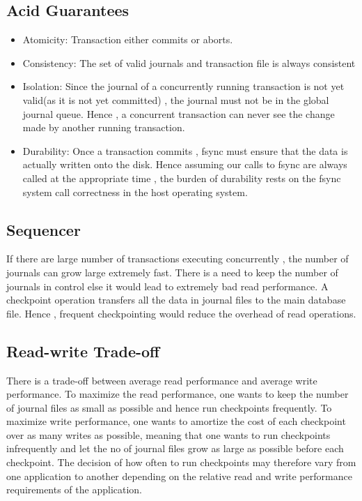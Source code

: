 \documentclass[11pt,a4paper]{article}
\begin{document}
\subsection{Acid Guarantees}
\begin{itemize}
\item Atomicity: 
    Transaction either commits or aborts.
\item Consistency: 
    The set of valid journals and transaction file is always consistent
\item Isolation: 
	Since the journal of a concurrently running transaction is not yet valid(as it is not yet committed) , the journal must not be in the global journal queue. Hence , a concurrent transaction can never see the change made by another running transaction.
\item Durability: 
    Once a transaction commits , fsync must ensure that the data is actually written onto the disk. Hence assuming our calls to fsync are always called at the appropriate time , the burden of durability rests on the fsync system call correctness in the host operating system.
\end{itemize}

\subsection{Sequencer}
If there are large number of transactions executing concurrently , the number of journals can grow large extremely fast. There is a need to keep the number of journals in control else it would lead to extremely bad read performance. A checkpoint operation transfers all the data in journal files to the main database file. Hence , frequent checkpointing would reduce the overhead of read operations.

\subsection{Read-write Trade-off}
There is a trade-off between average read performance and average write performance. To maximize the read performance, one wants to keep the number of journal files as small as possible and hence run checkpoints frequently. To maximize write performance, one wants to amortize the cost of each checkpoint over as many writes as possible, meaning that one wants to run checkpoints infrequently and let the no of journal files grow as large as possible before each checkpoint. The decision of how often to run checkpoints may therefore vary from one application to another depending on the relative read and write performance requirements of the application.
\end{document}
